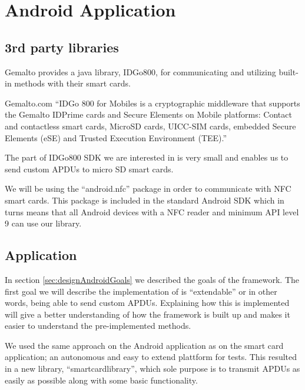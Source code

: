 \section{Android Application}

\subsection{3rd party libraries}
Gemalto provides a java library, IDGo800, for communicating and utilizing built-in methods with their smart cards.

\begin{aquote}{Gemalto.com \cite{GemaltoIDGo800}}
``IDGo 800 for Mobiles is a cryptographic middleware that supports the Gemalto IDPrime cards and Secure Elements on Mobile platforms: Contact and contactless smart cards, MicroSD cards, UICC-SIM cards, embedded Secure Elements (eSE) and Trusted Execution Environment (TEE).''
\end{aquote}

The part of IDGo800 SDK we are interested in is very small and enables us to send custom APDUs to micro SD smart cards.

We will be using the ``android.nfc'' package in order to communicate with NFC smart cards. This package is included in the standard Android SDK which in turns means that all Android devices with a NFC reader and minimum API level 9 \cite{androidNFCminSDK} can use our library.

\subsection{Application}
\label{sec:androidApp}

In section \ref{sec:designAndroidGoals} we described the goals of the framework. The first goal we will describe the implementation of is ``extendable'' or in other words, being able to send custom APDUs. Explaining how this is implemented will give a better understanding of how the framework is built up and makes it easier to understand the pre-implemented methods.

We used the same approach on the Android application as on the smart card application; an autonomous and easy to extend plattform for tests. This resulted in a new library, ``smartcardlibrary'',  which sole purpose is to transmit APDUs as easily as possible along with some basic functionality.

